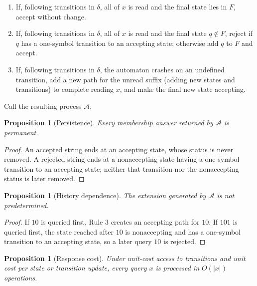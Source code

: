 \documentclass[11pt]{article}
\newtheorem{proposition}[definition]{Proposition}
\newcommand{\Aev}{\mathcal A}
\begin{document}
 \begin{enumerate}[label=\textbf{Rule \arabic*.}]
    \item If, following transitions in \( \delta\), all of \(x\) is read and the final state lies in \(F\), accept without change.
    \item If, following transitions in \( \delta\), all of \(x\) is read and the final state \(q\notin F\), reject if \(q\) has a
    one-symbol transition to an accepting state; otherwise add \(q\) to \(F\) and accept.
    \item If, following transitions in \( \delta\),  the automaton crashes on an undefined transition, add a new path for the unread
    suffix (adding new states and transitions) to complete reading \(x\), and make the final new state accepting.
\end{enumerate}

Call the resulting process \(\Aev\).



\begin{proposition}[Persistence]\label{prop:persistent-oracle}
Every membership answer returned by \(\Aev\) is permanent.
\end{proposition}

\begin{proof}
An accepted string ends at an accepting state, whose status is never removed.  A rejected
string ends at a nonaccepting state having a one-symbol transition to an accepting state;
neither that transition nor the nonaccepting status is later removed.
\end{proof}

\begin{proposition}[History dependence]\label{prop:history}
The extension generated by \(\Aev\) is not predetermined.
\end{proposition}

\begin{proof}
If \(10\) is queried first, Rule 3 creates an accepting path for \(10\).  If \(101\) is
queried first, the state reached after \(10\) is nonaccepting and has a one-symbol transition
to an accepting state, so a later query \(10\) is rejected.
\end{proof}

\begin{proposition}[Response cost]
Under unit-cost access to transitions and unit cost per state or transition update, every query
\(x\) is processed in \(O(|x|)\) operations.
\end{proposition}
\end{document}
